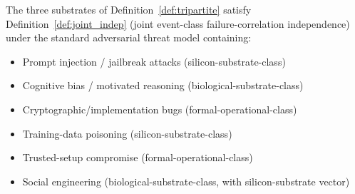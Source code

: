 \begin{proposition}
\label{prop:tripartite_indep}
The three substrates of Definition~\ref{def:tripartite} satisfy
Definition~\ref{def:joint_indep} (joint event-class
failure-correlation independence) under the standard adversarial
threat model containing:
\begin{itemize}
\item Prompt injection / jailbreak attacks (silicon-substrate-class)
\item Cognitive bias / motivated reasoning (biological-substrate-class)
\item Cryptographic/implementation bugs (formal-operational-class)
\item Training-data poisoning (silicon-substrate-class)
\item Trusted-setup compromise (formal-operational-class)
\item Social engineering (biological-substrate-class, with
  silicon-substrate vector)
\end{itemize}
\end{proposition}


